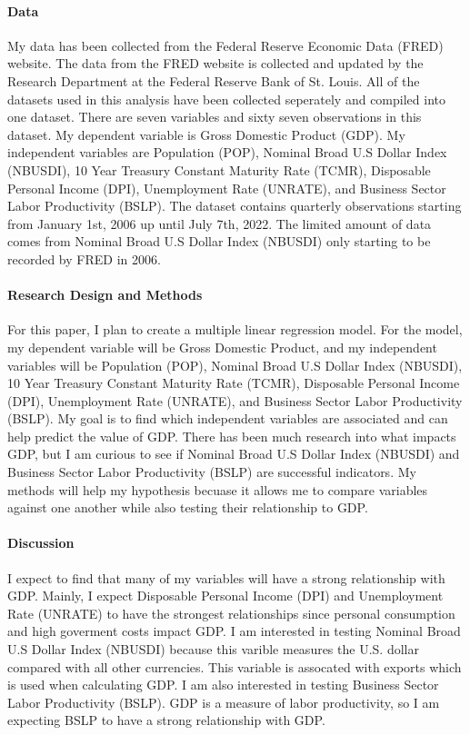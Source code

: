 \documentclass[12pt]{article}
\begin{document}
\paragraph{Data}
My data has been collected from the Federal Reserve Economic Data (FRED) website.
The data from the FRED website is collected and updated by the Research Department at the Federal Reserve Bank of St. Louis. 
All of the datasets used in this analysis have been collected seperately and compiled into one dataset. 
There are seven variables and sixty seven observations in this dataset. 
My dependent variable is Gross Domestic Product (GDP). 
My independent variables are Population (POP), Nominal Broad U.S Dollar Index (NBUSDI), 10 Year Treasury Constant Maturity Rate (TCMR), Disposable Personal Income (DPI), Unemployment Rate (UNRATE), and Business Sector Labor Productivity (BSLP). 
The dataset contains quarterly observations starting from January 1st, 2006 up until July 7th, 2022.
The limited amount of data comes from Nominal Broad U.S Dollar Index (NBUSDI) only starting to be recorded by FRED in 2006. 


\paragraph{Research Design and Methods}
For this paper, I plan to create a multiple linear regression model. 
For the model, my dependent variable will be Gross Domestic Product, and my independent variables will be Population (POP), Nominal Broad U.S Dollar Index (NBUSDI), 10 Year Treasury Constant Maturity Rate (TCMR), Disposable Personal Income (DPI), Unemployment Rate (UNRATE), and Business Sector Labor Productivity (BSLP). 
My goal is to find which independent variables are associated and can help predict the value of GDP. 
There has been much research into what impacts GDP, but I am curious to see if Nominal Broad U.S Dollar Index (NBUSDI) and  Business Sector Labor Productivity (BSLP) are successful indicators. 
My methods will help my hypothesis becuase it allows me to compare variables against one another while also testing their relationship to GDP.


\paragraph{Discussion}
I expect to find that many of my variables will have a strong relationship with GDP.
Mainly, I expect Disposable Personal Income (DPI) and Unemployment Rate (UNRATE) to have the strongest relationships since personal consumption and high goverment costs impact GDP.
I am interested in testing Nominal Broad U.S Dollar Index (NBUSDI) because this varible measures the U.S. dollar compared with all other currencies. 
This variable is assocated with exports which is used when calculating GDP.
I am also interested in testing Business Sector Labor Productivity (BSLP). GDP is a measure of labor productivity, so I am expecting BSLP to have a strong relationship with GDP. 
\end{document}
